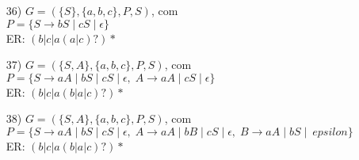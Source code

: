 \begin{enumerate}
    \item[36)] 
    $G = (\{S\}, \{a,b,c\}, P, S)$, com \\
    $P = \{ S \to bS \mid cS \mid \epsilon \}$ \\[6pt]
    ER: $(b|c|a(a|c)?)*$

    \item[37)] 
    $G = (\{S,A\}, \{a,b,c\}, P, S)$, com \\
    $P = \{ 
    S \to aA \mid bS \mid cS \mid \epsilon,\;
    A \to aA \mid cS \mid \epsilon \}$ \\[6pt]
    ER: $(b|c|a(b|a|c)?)*$

    \item[38)] 
    $G = (\{S,A\}, \{a,b,c\}, P, S)$, com \\
    $P = \{ 
    S \to aA \mid bS \mid cS \mid \epsilon,\;
    A \to aA \mid bB \mid cS \mid \epsilon,\;
    B \to aA \mid bS \mid \ epsilon \}$ \\[6pt]
    ER: $(b|c|a(b|a|c)?)*$
\end{enumerate}
